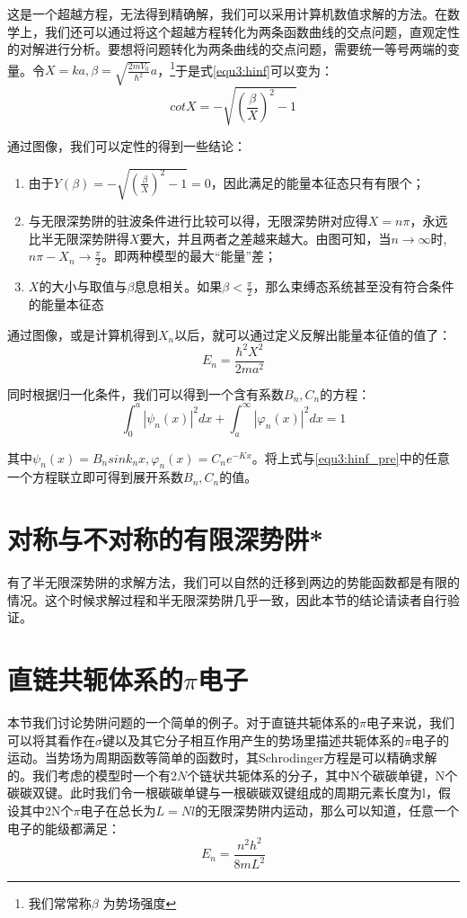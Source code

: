 这是一个超越方程，无法得到精确解，我们可以采用计算机数值求解的方法。在数学上，我们还可以通过将这个超越方程转化为两条函数曲线的交点问题，直观定性的对解进行分析。要想将问题转化为两条曲线的交点问题，需要统一等号两端的变量。令$X=ka,\beta=\sqrt{\frac{2mV_0}{\hbar^2}} a$，\footnote{我们常常称$\beta$ 为势场强度}于是式\ref{equ3:hinf}可以变为：
\begin{equation}
    cotX=-\sqrt{(\frac{\beta}{X})^2-1}
\end{equation}


通过图像，我们可以定性的得到一些结论：
\begin{enumerate}
    \item 由于$Y(\beta)=-\sqrt{(\frac{\beta}{X})^2-1}=0$，因此满足的能量本征态只有有限个；
    \item 与无限深势阱的驻波条件进行比较可以得，无限深势阱对应得$X=n\pi $，永远比半无限深势阱得$X$要大，并且两者之差越来越大。由图可知，当$n\rightarrow \infty $时,$n\pi-X_n\rightarrow \frac{\pi}{2}$。即两种模型的最大“能量”差；
    \item $X$的大小与取值与$\beta$息息相关。如果$\beta <\frac{\pi}{2}$，那么束缚态系统甚至没有符合条件的能量本征态
\end{enumerate}

通过图像，或是计算机得到$X_n$以后，就可以通过定义反解出能量本征值的值了：
\begin{equation}
    E_n=\frac{\hbar^2X^2}{2ma^2}
\end{equation}

同时根据归一化条件，我们可以得到一个含有系数$B_n,C_n$的方程：
\begin{equation}
    \int_0^a|\psi_n(x)|^2dx+\int_a^\infty|\varphi_n(x)|^2dx=1
\end{equation}

其中$\psi_n(x)=B_nsink_nx,\varphi_n(x)=C_ne^{-Kx}$。将上式与\ref{equ3:hinf_pre}中的任意一个方程联立即可得到展开系数$B_n,C_n$的值。

\section{对称与不对称的有限深势阱*}
有了半无限深势阱的求解方法，我们可以自然的迁移到两边的势能函数都是有限的情况。这个时候求解过程和半无限深势阱几乎一致，因此本节的结论请读者自行验证。
\section{直链共轭体系的$\pi$电子}
 本节我们讨论势阱问题的一个简单的例子。对于直链共轭体系的$\pi$电子来说，我们可以将其看作在$\sigma$键以及其它分子相互作用产生的势场里描述共轭体系的$\pi$电子的运动。当势场为周期函数等简单的函数时，其Schrodinger方程是可以精确求解的。我们考虑的模型时一个有$2N$个链状共轭体系的分子，其中N个碳碳单键，N个碳碳双键。此时我们令一根碳碳单键与一根碳碳双键组成的周期元素长度为l，假设其中2N个$\pi$电子在总长为$L=Nl$的无限深势阱内运动，那么可以知道，任意一个电子的能级都满足：
 \begin{equation}
     E_n=\frac{n^2h^2}{8mL^2}
 \end{equation}
 

